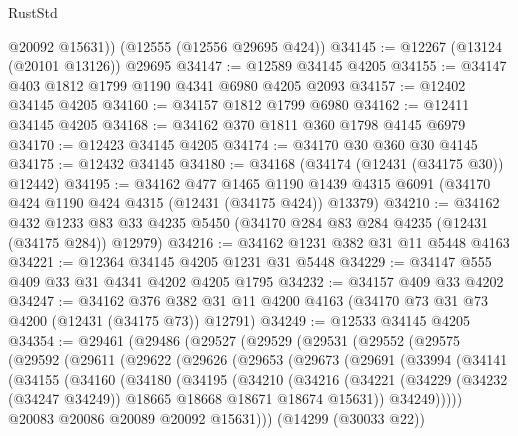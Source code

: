 \begin{lexlean}{RustStd}
\begin{coremodule}
        @20092
        @15631))
    (@12555 (@12556 @29695 @424))
@34145 := @12267 (@13124 (@20101 @13126)) @29695
@34147 := @12589 @34145 @4205
@34155 := @34147 @403 @1812 @1799 @1190 @4341 @6980 @4205 @2093
@34157 := @12402 @34145 @4205
@34160 := @34157 @1812 @1799 @6980
@34162 := @12411 @34145 @4205
@34168 := @34162 @370 @1811 @360 @1798 @4145 @6979
@34170 := @12423 @34145 @4205
@34174 := @34170 @30 @360 @30 @4145
@34175 := @12432 @34145
@34180 := @34168 (@34174 (@12431 (@34175 @30)) @12442)
@34195 := @34162
    @477
    @1465
    @1190
    @1439
    @4315
    @6091
    (@34170 @424 @1190 @424 @4315 (@12431 (@34175 @424)) @13379)
@34210 := @34162
    @432
    @1233
    @83
    @33
    @4235
    @5450
    (@34170 @284 @83 @284 @4235 (@12431 (@34175 @284)) @12979)
@34216 := @34162 @1231 @382 @31 @11 @5448 @4163
@34221 := @12364 @34145 @4205 @1231 @31 @5448
@34229 := @34147 @555 @409 @33 @31 @4341 @4202 @4205 @1795
@34232 := @34157 @409 @33 @4202
@34247 := @34162
    @376
    @382
    @31
    @11
    @4200
    @4163
    (@34170 @73 @31 @73 @4200 (@12431 (@34175 @73)) @12791)
@34249 := @12533 @34145 @4205
@34354 := @29461
    (@29486
      (@29527
        (@29529
          (@29531
            (@29552
              (@29575
                (@29592
                  (@29611
                    (@29622
                      (@29626
                        (@29653
                          (@29673
                            (@29691
                              (@33994
                                (@34141
                                  (@34155
                                    (@34160
                                      (@34180
                                        (@34195
                                          (@34210
                                            (@34216
                                              (@34221
                                                (@34229
                                                  (@34232 (@34247 @34249))
                                                  @18665
                                                  @18668
                                                  @18671
                                                  @18674
                                                  @15631))
                                              @34249)))))
                                    @20083
                                    @20086
                                    @20089
                                    @20092
                                    @15631)))
                              (@14299 (@30033 @22))

\end{coremodule}
\end{lexlean}
